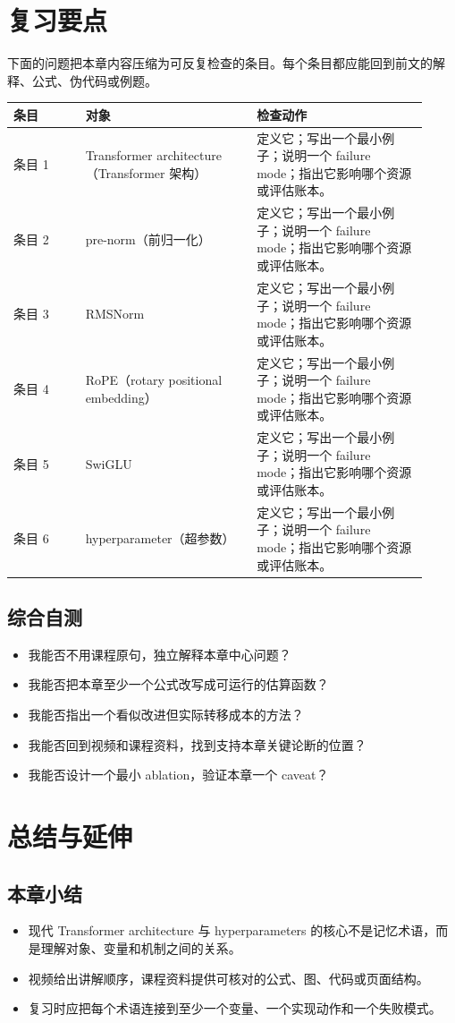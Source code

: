 \documentclass[a4paper]{article}
\begin{document}
\section{复习要点}
下面的问题把本章内容压缩为可反复检查的条目。每个条目都应能回到前文的解释、公式、伪代码或例题。
\begin{longtable}{p{0.16\linewidth}p{0.38\linewidth}p{0.38\linewidth}}
\toprule
\textbf{条目} & \textbf{对象} & \textbf{检查动作}\\
\midrule
条目 1 & Transformer architecture（Transformer 架构） & 定义它；写出一个最小例子；说明一个 failure mode；指出它影响哪个资源或评估账本。\\
条目 2 & pre-norm（前归一化） & 定义它；写出一个最小例子；说明一个 failure mode；指出它影响哪个资源或评估账本。\\
条目 3 & RMSNorm & 定义它；写出一个最小例子；说明一个 failure mode；指出它影响哪个资源或评估账本。\\
条目 4 & RoPE（rotary positional embedding） & 定义它；写出一个最小例子；说明一个 failure mode；指出它影响哪个资源或评估账本。\\
条目 5 & SwiGLU & 定义它；写出一个最小例子；说明一个 failure mode；指出它影响哪个资源或评估账本。\\
条目 6 & hyperparameter（超参数） & 定义它；写出一个最小例子；说明一个 failure mode；指出它影响哪个资源或评估账本。\\
\bottomrule
\end{longtable}
\subsection{综合自测}
\begin{itemize}
\item 我能否不用课程原句，独立解释本章中心问题？
\item 我能否把本章至少一个公式改写成可运行的估算函数？
\item 我能否指出一个看似改进但实际转移成本的方法？
\item 我能否回到视频和课程资料，找到支持本章关键论断的位置？
\item 我能否设计一个最小 ablation，验证本章一个 caveat？
\end{itemize}
\section{总结与延伸}
\subsection{本章小结}
\begin{itemize}
\item 现代 Transformer architecture 与 hyperparameters 的核心不是记忆术语，而是理解对象、变量和机制之间的关系。
\item 视频给出讲解顺序，课程资料提供可核对的公式、图、代码或页面结构。
\item 复习时应把每个术语连接到至少一个变量、一个实现动作和一个失败模式。
\end{itemize}
\end{document}
